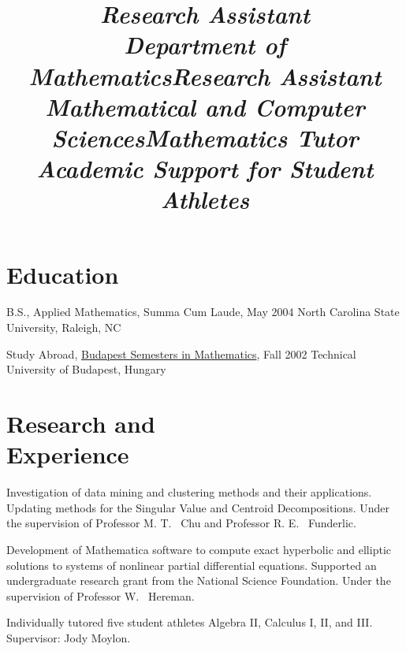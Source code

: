 \documentclass[margin,line,11pt,final]{res}
\begin{document}
\begin{resume}

\section{\sc Education}
B.S., Applied Mathematics, Summa Cum Laude, May 2004 \newline
North Carolina State University, Raleigh, NC

Study Abroad, \href{http://www.stolaf.edu/depts/math/budapest/}
{Budapest Semesters in Mathematics}, Fall 2002 \newline
Technical University of Budapest, Hungary


\section{\sc Research and \\Experience}

\title{\em Research Assistant \\ Department of Mathematics}
\location{}
\begin{position}
Investigation of data mining and clustering methods and their
applications. Updating methods for the Singular Value and Centroid
Decompositions. Under the supervision of Professor M. T. \ Chu and
Professor R. E. \ Funderlic.
\end{position}

\title{\em Research Assistant \\ Mathematical and Computer Sciences}
\location{}
\begin{position}
Development of Mathematica software to compute exact hyperbolic and
elliptic solutions to systems of nonlinear partial differential
equations. Supported an undergraduate research grant from the National
Science Foundation.  Under the supervision of Professor W. \ Hereman.
\end{position}

\title{\em Mathematics Tutor \\ Academic Support for Student Athletes}
\location{}
\begin{position}
Individually tutored five student athletes Algebra II, Calculus I, II,
and III. Supervisor: Jody Moylon.
\end{position}


\end{resume}
\end{document}

